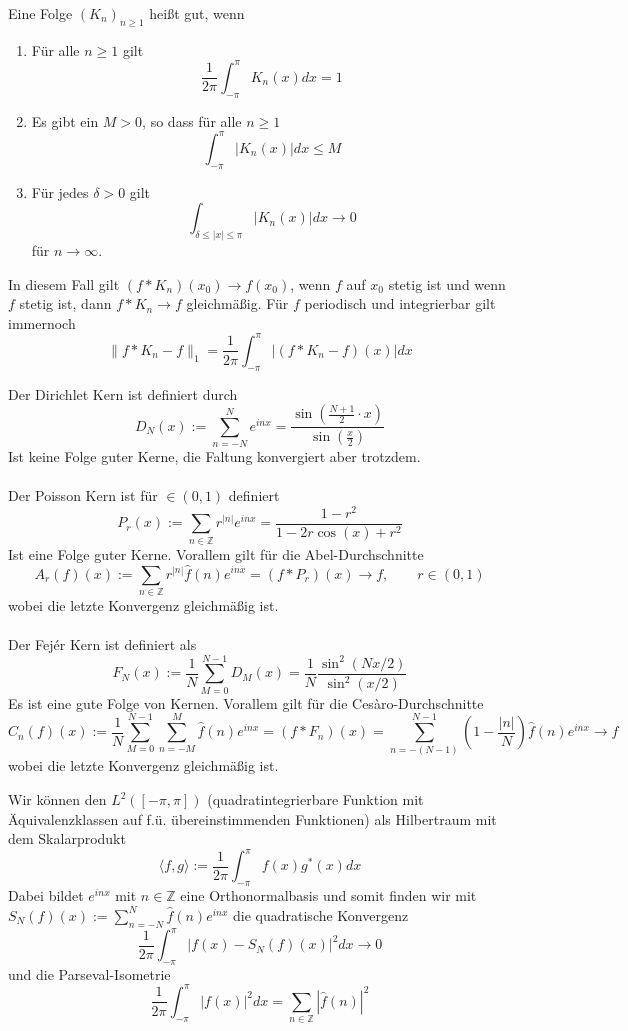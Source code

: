 \documentclass[11pt]{article}
\newenvironment{problem}[1]{
    \begin{trivlist}
        \item[\hskip \labelsep {\bfseries #1}] }{
    \end{trivlist}\normalshape
}
\newcommand{\Z}{\mathbb{Z}}
\begin{document}
    \begin{problem}{Folge guter Kerne}
        Eine Folge $(K_n)_{n\geq 1}$ heißt gut, wenn
        \begin{enumerate}[label = (\roman{enumi})]
        \item Für alle $n\geq 1$ gilt
        $$\frac{1}{2\pi}\int_{-\pi}^{\pi} K_n(x)dx=1$$
        \item Es gibt ein $M>0$, so dass für alle $n\geq 1$
        $$\int_{-\pi}^{\pi} |K_n(x)|dx\leq M$$
        \item Für jedes $\delta>0$ gilt
        $$\int_{\delta\leq |x|\leq \pi}|K_n(x)|dx\to 0 $$
        für $n\to\infty$.
        \end{enumerate}
        In diesem Fall gilt $(f*K_n)(x_0)\to f(x_0)$, wenn $f$ auf $x_0$ stetig ist und wenn $f$ stetig
        ist, dann $f*K_n\to f$ gleichmäßig. Für $f$ periodisch und integrierbar gilt immernoch
        $$\|f*K_n-f\|_1=\frac{1}{2\pi}\int_{-\pi}^{\pi}|(f*K_n-f)(x)|dx$$
    \end{problem}

    \begin{problem}{Kerne}
        Der Dirichlet Kern ist definiert durch
        $$D_N(x):=\sum_{n=-N}^N e^{inx}=\frac{\sin\left(\frac{N+1}{2}\cdot x\right)}{\sin\left(
        \frac{x}{2}\right)}$$
        Ist keine Folge guter Kerne, die Faltung konvergiert aber trotzdem.\\\\
        Der Poisson Kern ist für $\in (0,1)$ definiert
        $$P_r(x):=\sum_{n\in \Z}r^{|n|}e^{inx}=\frac{1-r^2}{1-2r\cos(x)+r^2}$$
        Ist eine Folge guter Kerne. Vorallem gilt für die Abel-Durchschnitte
        $$A_r(f)(x):=\sum_{n\in\Z}r^{|n|}\hat{f}(n)e^{inx}=(f*P_r)(x)\to f,\qquad r\in(0,1)$$
        wobei die letzte Konvergenz gleichmäßig ist. \\\\
        Der Fejér Kern ist definiert als
        $$F_N(x):=\frac{1}{N}\sum_{M=0}^{N-1}D_M(x)=\frac{1}{N}\frac{\sin^2(Nx/2)}{\sin^2(x/2)}$$
        Es ist eine gute Folge von Kernen. Vorallem gilt für die Cesàro-Durchschnitte
        $$C_n(f)(x):= \frac{1}{N}\sum_{M=0}^{N-1}\sum_{n=-M}^M \hat{f}(n)e^{inx}=(f*F_n)(x)
        =\sum_{n=-(N-1)}^{N-1}(1-\frac{|n|}{N})\hat{f}(n)e^{inx}\to f$$
        wobei die letzte Konvergenz gleichmäßig ist.
    \end{problem}

    \begin{problem}{Interpretation als Hilbertraum}
        Wir können den $L^2([-\pi,\pi])$ (quadratintegrierbare Funktion mit Äquivalenzklassen auf f.ü.
        übereinstimmenden Funktionen) als Hilbertraum mit dem Skalarprodukt
        $$\langle f,g \rangle:= \frac{1}{2\pi}\int_{-\pi}^{\pi} f(x)g^*(x)dx$$
        Dabei bildet $e^{inx}$ mit $n\in\Z$ eine Orthonormalbasis und somit finden wir mit
        $S_N(f)(x):=\sum_{n=-N}^N \hat{f}(n)e^{inx}$ die quadratische Konvergenz
        $$\frac{1}{2\pi}\int_{-\pi}^\pi |f(x)-S_N(f)(x)|^2 dx\to 0$$
        und die Parseval-Isometrie
        $$\frac{1}{2\pi}\int_{-\pi}^{\pi}|f(x)|^2dx =\sum_{n\in \Z}|\hat{f}(n)|^2$$
    \end{problem}
\end{document}
